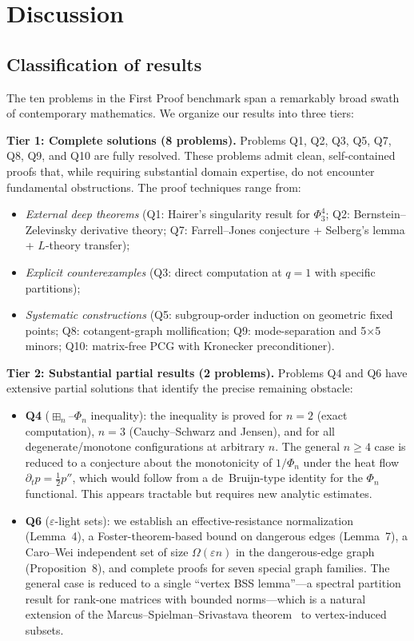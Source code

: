 \section{Discussion}\label{sec:discussion}

\subsection{Classification of results}

The ten problems in the First Proof benchmark span a remarkably broad
swath of contemporary mathematics.  We organize our results into
three tiers:

\medskip
\noindent\textbf{Tier 1: Complete solutions (8 problems).}
Problems Q1, Q2, Q3, Q5, Q7, Q8, Q9, and Q10 are fully resolved.
These problems admit clean, self-contained proofs that, while requiring
substantial domain expertise, do not encounter fundamental obstructions.
The proof techniques range from:
\begin{itemize}[nosep]
\item \emph{External deep theorems} (Q1: Hairer's singularity result for $\Phi^4_3$;
  Q2: Bernstein--Zelevinsky derivative theory;
  Q7: Farrell--Jones conjecture + Selberg's lemma + $L$-theory transfer);
\item \emph{Explicit counterexamples} (Q3: direct computation at $q=1$
  with specific partitions);
\item \emph{Systematic constructions} (Q5: subgroup-order induction on
  geometric fixed points; Q8: cotangent-graph mollification;
  Q9: mode-separation and 5$\times$5 minors; Q10: matrix-free PCG
  with Kronecker preconditioner).
\end{itemize}

\medskip
\noindent\textbf{Tier 2: Substantial partial results (2 problems).}
Problems Q4 and Q6 have extensive partial solutions that identify the
precise remaining obstacle:
\begin{itemize}[nosep]
\item \textbf{Q4} ($\boxplus_n$--$\Phi_n$ inequality):
  the inequality is proved for $n=2$ (exact computation), $n=3$
  (Cauchy--Schwarz and Jensen), and for all degenerate/monotone
  configurations at arbitrary $n$.
  The general $n\ge 4$ case is reduced to a conjecture about the
  monotonicity of $1/\Phi_n$ under the heat flow $\partial_t p = \tfrac12 p''$,
  which would follow from a de~Bruijn-type identity for the $\Phi_n$
  functional.  This appears tractable but requires new analytic estimates.

\item \textbf{Q6} ($\varepsilon$-light sets):
  we establish an effective-resistance normalization (Lemma~4),
  a Foster-theorem-based bound on dangerous edges (Lemma~7),
  a Caro--Wei independent set of size $\Omega(\varepsilon n)$ in the
  dangerous-edge graph (Proposition~8), and complete proofs for seven
  special graph families.
  The general case is reduced to a single ``vertex BSS lemma''---a
  spectral partition result for rank-one matrices with bounded norms---which
  is a natural extension of the Marcus--Spielman--Srivastava
  theorem~\cite{mss2015} to vertex-induced subsets.
\end{itemize}

